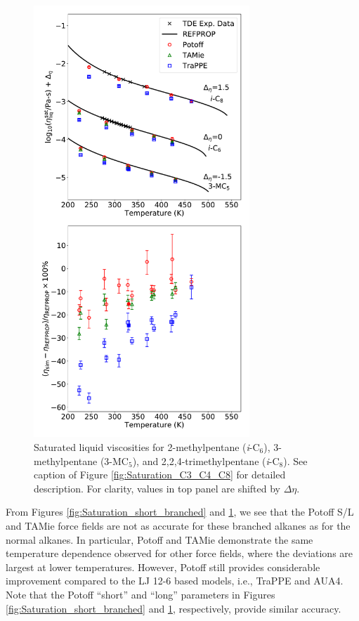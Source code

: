 \documentclass[preprint,review,12pt]{elsarticle}
\begin{document}
	\begin{figure}[htb!]
		\centering
		\includegraphics[width=3.2in]{compare_force_fields_long_branched.pdf}
		\caption{Saturated liquid viscosities for 2-methylpentane (\textit{i}-C$_{6}$), 3-methylpentane (3-MC$_5$), and 2,2,4-trimethylpentane (\textit{i}-C$_{8}$). See caption of Figure \ref{fig:Saturation_C3_C4_C8} for detailed description. For clarity, values in top panel are shifted by $\Delta \eta$.}
		\label{fig:Saturation_long_branched}
	\end{figure} 
	
	From Figures \ref{fig:Saturation_short_branched} and \ref{fig:Saturation_long_branched}, we see that the Potoff S/L and TAMie force fields are not as accurate for these branched alkanes as for the normal alkanes. In particular, Potoff and TAMie demonstrate the same temperature dependence observed for other force fields, where the deviations are largest at lower temperatures. However, Potoff still provides considerable improvement compared to the LJ 12-6 based models, i.e., TraPPE and AUA4. Note that the Potoff ``short'' and ``long'' parameters in Figures \ref{fig:Saturation_short_branched} and \ref{fig:Saturation_long_branched}, respectively, provide similar accuracy. 
	
\end{document}
